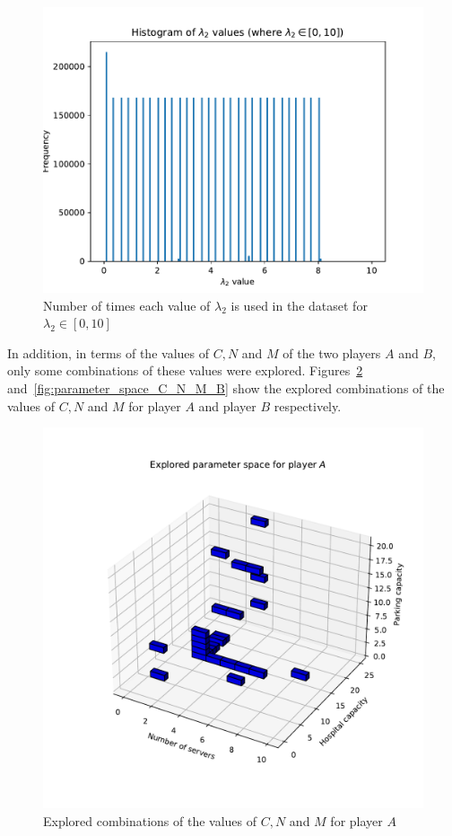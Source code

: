 \begin{figure}[H]
    \centering
    \includegraphics[width=\linewidth]{chapters/05_numerical_results/Bin/lambda_2_histogram_0_10.pdf}
    \caption{Number of times each value of \(\lambda_2\) is used in the dataset
        for \(\lambda_2 \in [0, 10]\)}
    \label{fig:data_description_lambda_2_0_10}
\end{figure}

In addition, in terms of the values of \(C, N\) and \(M\) of the two players
\(A\) and \(B\), only some combinations of these values were explored.
Figures~\ref{fig:parameter_space_C_N_M_A} and~\ref{fig:parameter_space_C_N_M_B}
show the explored combinations of the values of \(C, N\) and \(M\) for player
\(A\) and player \(B\) respectively.

\begin{figure}[H]
    \centering
    \includegraphics[width=\linewidth]{chapters/05_numerical_results/Bin/explored_parameters_1.pdf}
    \caption{Explored combinations of the values of \(C, N\) and \(M\) for
    player \(A\)}
    \label{fig:parameter_space_C_N_M_A}
\end{figure}

